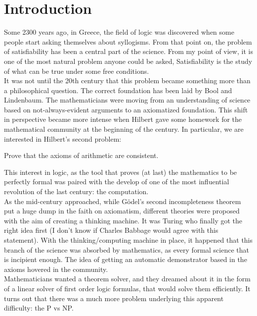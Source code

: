 
\chapter{Introduction}
Some 2300 years ago, in Greece,  the field of logic was discovered when some people start asking themselves about syllogisms. From that point on, the problem of satisfiability has been a central part of the science.  From my point of view, it is one of the most natural problem anyone could be asked,  Satisfiability is the study of what can be true under some free conditions.\\

It was not until the 20th century that this problem became something more than a philosophical question. The correct foundation has been laid by Bool and Lindenbaum. The mathematicians were moving from an understanding of science based on not-always-evident arguments to an axiomatized foundation. This shift in perspective became more intense when Hilbert gave some homework for the mathematical community at the beginning of the century. In particular, we are interested in Hilbert's second problem:


\begin{quoting}
Prove that the axioms of arithmetic are consistent. 
\end{quoting}

This interest in logic, as the tool that proves (at last) the mathematics to be perfectly formal was paired with the develop of one of the most influential revolution of the last century: the computation.\\

As the mid-century approached, while Gödel's second incompleteness theorem put a huge dump in the faith on axiomatism,  different theories were proposed with the aim of creating a thinking machine. It was Turing who finally got the right idea first (I don't know if Charles Babbage would agree with this statement). With the thinking/computing machine in place, it happened that this branch of the science was absorbed by mathematics, as every formal science that is incipient enough.  The idea of getting an automatic demonstrator based in the axioms hovered in the community.\\


Mathematicians wanted a theorem solver, and they dreamed about it in the form of a linear solver of first order logic formulas, that would solve them efficiently. It turns out that there was a much more problem underlying this apparent difficulty: the P vs NP.\\

